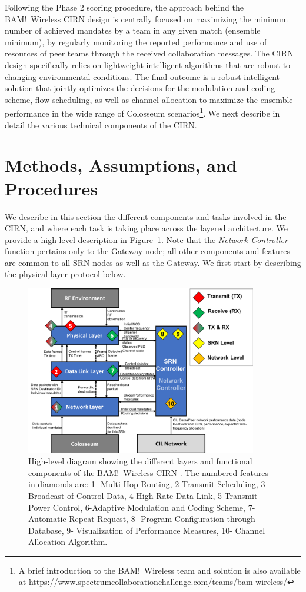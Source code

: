 \documentclass[11pt]{article}
\begin{document}
Following the Phase 2 scoring procedure, the approach behind the BAM!\ Wireless CIRN design is centrally focused on maximizing the minimum number of achieved mandates by a team in any given match (ensemble minimum), by regularly monitoring the reported performance and use of resources of peer teams through the received collaboration messages. The CIRN design specifically relies on lightweight intelligent algorithms that are robust to changing environmental conditions. The final outcome is a robust intelligent solution that jointly optimizes the decisions for the modulation and coding scheme, flow scheduling, as well as channel allocation to maximize the ensemble performance in the wide range of Colosseum scenarios\footnote{A brief introduction to the BAM!\ Wireless team and solution is also available at https://www.spectrumcollaborationchallenge.com/teams/bam-wireless/}. We next describe in detail the various technical components of the CIRN.
 
\section{Methods, Assumptions, and Procedures}
We describe in this section the different components and tasks involved in the CIRN, and where each task is taking place across the layered architecture. We provide a high-level description in Figure~\ref{fig:arch}. Note that the \emph{Network Controller} function pertains only to the Gateway node; all other components and features  are common to all SRN nodes as well as the Gateway. We first start by describing the physical layer protocol below.
\begin{figure} [htb]
 \centerline{
 \includegraphics[width = 0.9\textwidth]{Figures/SysFuncBD.png}}
 \caption{High-level diagram showing the different layers and functional components of the BAM!\ Wireless CIRN \cite[Figure $2$]{func-report}. The numbered features in diamonds are: 1- Multi-Hop Routing, 2-Transmit Scheduling, 3-Broadcast of Control Data, 4-High Rate Data Link, 5-Transmit Power Control, 6-Adaptive Modulation and Coding Scheme, 7-Automatic Repeat Request, 8- Program Configuration through Database, 9- Visualization of Performance Measures, 10- Channel Allocation Algorithm.}
 \label{fig:arch}
 \end{figure} 
\end{document}
